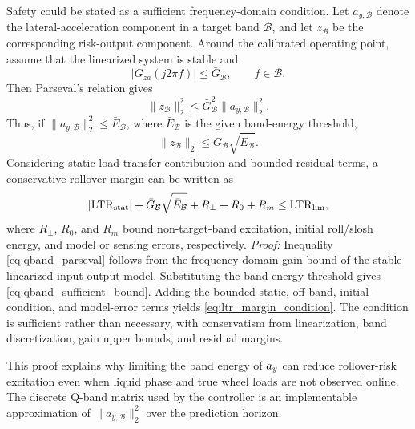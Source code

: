 Safety could be stated as a sufficient frequency-domain condition. Let $a_{y,\mathcal{B}}$ denote the lateral-acceleration component in a target band $\mathcal{B}$, and let $z_{\mathcal{B}}$ be the corresponding risk-output component. Around the calibrated operating point, assume that the linearized system is stable and
\begin{equation}
    |G_{za}(j2\pi f)|\leq \bar{G}_{\mathcal{B}},\qquad f\in\mathcal{B}.
\end{equation}
Then Parseval's relation gives
\begin{equation}
    \|z_{\mathcal{B}}\|_2^2
    \leq \bar{G}_{\mathcal{B}}^2\|a_{y,\mathcal{B}}\|_2^2 .
    \label{eq:qband_parseval}
\end{equation}
Thus, if $\|a_{y,\mathcal{B}}\|_2^2\leq\bar E_{\mathcal{B}}$, where $\bar E_{\mathcal{B}}$ is the given band-energy threshold,
\begin{equation}
    \|z_{\mathcal{B}}\|_2 \leq \bar{G}_{\mathcal{B}}\sqrt{\bar E_{\mathcal{B}}}.
    \label{eq:qband_sufficient_bound}
\end{equation}
Considering static load-transfer contribution and bounded residual terms, a conservative rollover margin can be written as
\begin{equation}
    |\mathrm{LTR}_{\mathrm{stat}}|+\bar{G}_{\mathcal{B}}\sqrt{\bar E_{\mathcal{B}}}
    +R_\perp+R_0+R_m\leq \mathrm{LTR}_{\mathrm{lim}},
    \label{eq:ltr_margin_condition}
\end{equation}
where $R_\perp$, $R_0$, and $R_m$ bound non-target-band excitation, initial roll/slosh energy, and model or sensing errors, respectively.
\textit{Proof:} Inequality \eqref{eq:qband_parseval} follows from the frequency-domain gain bound of the stable linearized input-output model. Substituting the band-energy threshold gives \eqref{eq:qband_sufficient_bound}. Adding the bounded static, off-band, initial-condition, and model-error terms yields \eqref{eq:ltr_margin_condition}. The condition is sufficient rather than necessary, with conservatism from linearization, band discretization, gain upper bounds, and residual margins.

This proof explains why limiting the band energy of $a_y$ can reduce rollover-risk excitation even when liquid phase and true wheel loads are not observed online. The discrete Q-band matrix used by the controller is an implementable approximation of $\|a_{y,\mathcal{B}}\|_2^2$ over the prediction horizon.

